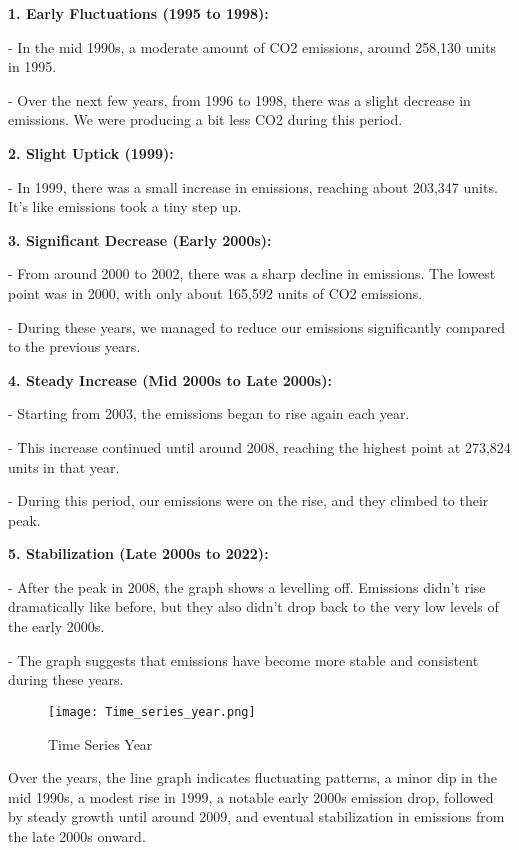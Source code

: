 \documentclass[12pt, a4paper,oneside]{book}
\numberwithin{equation}{section}
\begin{document}
\textbf{1. Early Fluctuations (1995 to 1998):}

- In the mid 1990s, a moderate amount of CO2 emissions, around 258,130 units in 1995.
   
 - Over the next few years, from 1996 to 1998, there was a slight decrease in emissions. We were producing a bit less CO2 during this period.

\textbf{2. Slight Uptick (1999):}

 - In 1999, there was a small increase in emissions, reaching about 203,347 units. It's like emissions took a tiny step up.

\textbf{3. Significant Decrease (Early 2000s):}

- From around 2000 to 2002, there was a sharp decline in emissions. The lowest point was in 2000, with only about 165,592 units of CO2 emissions.

- During these years, we managed to reduce our emissions significantly compared to the previous years.

\textbf{4. Steady Increase (Mid 2000s to Late 2000s):}
  
- Starting from 2003, the emissions began to rise again each year.

- This increase continued until around 2008, reaching the highest point at 273,824 units in that year.

- During this period, our emissions were on the rise, and they climbed to their peak.

\textbf{5. Stabilization (Late 2000s to 2022):}
  
- After the peak in 2008, the graph shows a levelling off. Emissions didn't rise dramatically like before, but they also didn't drop back to the very low levels of the early 2000s.

- The graph suggests that emissions have become more stable and consistent during these years.

 \begin{figure}[H]
\centerline{\texttt{[image: Time\_series\_year.png]}}
\caption{Time Series Year}
\label{fig:4.2}
\end{figure}
\newline
Over the years, the line graph indicates fluctuating patterns, a minor dip in the mid 1990s, a modest rise in 1999, a notable early 2000s emission drop, followed by steady growth until around 2009, and eventual stabilization in emissions from the late 2000s onward.
\end{document}
